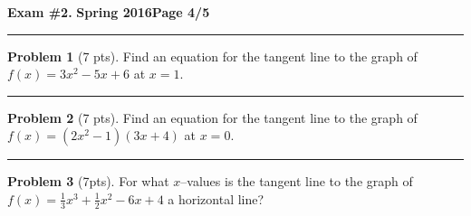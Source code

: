 \documentclass[12pt]{article}
\theoremstyle{definition}
\newtheorem{problem}{Problem}
\begin{document}
\newpage

\hfill{\large\bf Exam \#2.}\hfill{\large\bf
  Spring 2016}\hfill{\large\bf Page 4/5}\hrule

\bigskip

\begin{problem}[7 pts]
Find an equation for the tangent line to the graph of $f(x) = 3x^2-5x+6$ at $x=1$.

\vspace{4cm} 

\begin{flushright}
\end{flushright}
\end{problem}
\hrule

\begin{problem}[7 pts]
Find an equation for the tangent line to the graph of $f(x) = (2x^2-1)(3x+4)$ at $x=0$.

\vspace{5cm} 

\begin{flushright}
\end{flushright}
\end{problem}
\hrule

\begin{problem}[7pts]
For what $x$--values is the tangent line to the graph of $f(x) = \tfrac{1}{3}x^3+\tfrac{1}{2}x^2-6x+4$ a horizontal line?

\vspace{5cm} 

\begin{flushright}
\end{flushright}
\end{problem}

\newpage
\end{document}
